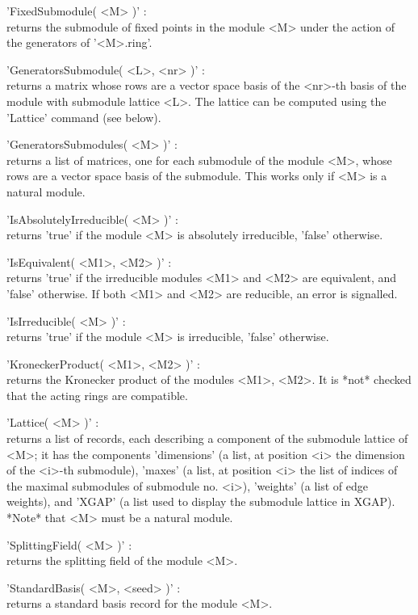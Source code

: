 'FixedSubmodule( <M> )' : \\
    returns the submodule of fixed points in the {\MeatAxe} module <M> under
    the action of the generators of '<M>.ring'.

'GeneratorsSubmodule( <L>, <nr> )' : \\
    returns a {\MeatAxe} matrix whose rows are a vector space basis of the
    <nr>-th basis of the module with submodule lattice <L>.  The lattice
    can be computed using the 'Lattice' command (see below).

'GeneratorsSubmodules( <M> )' : \\
    returns a list of {\MeatAxe} matrices, one for each submodule of the
    {\MeatAxe} module <M>, whose rows are a vector space basis of the
    submodule.  This works only if <M> is a natural module.

'IsAbsolutelyIrreducible( <M> )' : \\
    returns 'true' if the {\MeatAxe} module <M> is absolutely irreducible,
    'false' otherwise.

'IsEquivalent( <M1>, <M2> )' : \\
    returns 'true' if the irreducible {\MeatAxe} modules <M1> and <M2>
    are equivalent, and 'false' otherwise.  If both <M1> and <M2> are
    reducible, an error is signalled.

'IsIrreducible( <M> )' : \\
    returns 'true' if the {\MeatAxe} module <M> is irreducible, 'false'
    otherwise.

'KroneckerProduct( <M1>, <M2> )' : \\
    returns the Kronecker product of the {\MeatAxe} modules <M1>, <M2>.
    It is *not* checked that the acting rings are compatible.

'Lattice( <M> )' : \\
    returns a list of records, each describing a component of the submodule
    lattice of <M>; it has the components 'dimensions' (a list, at position
    <i> the dimension of the <i>-th submodule), 'maxes' (a list, at
    position <i> the list of indices of the maximal submodules of submodule
    no. <i>), 'weights' (a list of edge weights), and 'XGAP' (a list used
    to display the submodule lattice in {\sf XGAP}).
    *Note* that <M> must be a natural module.

'SplittingField( <M> )' : \\
    returns the splitting field of the {\MeatAxe} module <M>.

'StandardBasis( <M>, <seed> )' : \\
    returns a standard basis record for the {\MeatAxe} module <M>.

